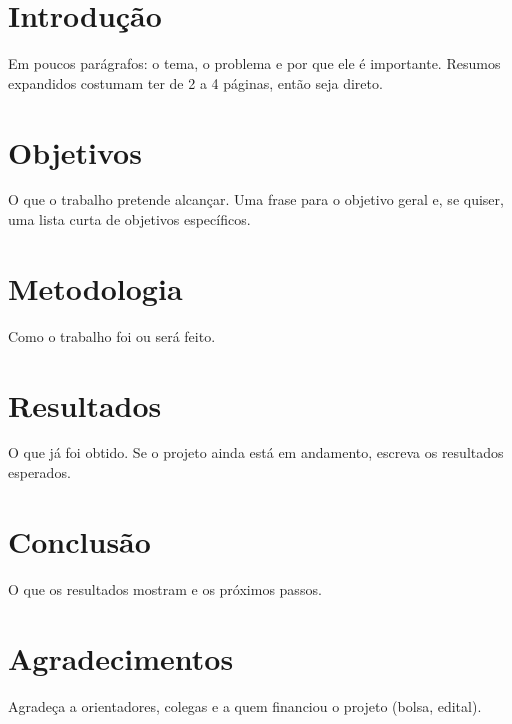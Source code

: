 \documentclass[12pt,a4paper]{article}
\title{$titulo}
\author{$autor \\ Nome da instituição}
\date{}
\begin{document}
\maketitle

\section{Introdução}

Em poucos parágrafos: o tema, o problema e por que ele é importante. Resumos expandidos costumam ter de 2 a 4 páginas, então seja direto.

\section{Objetivos}

O que o trabalho pretende alcançar. Uma frase para o objetivo geral e, se quiser, uma lista curta de objetivos específicos.

\section{Metodologia}

Como o trabalho foi ou será feito.

\section{Resultados}

O que já foi obtido. Se o projeto ainda está em andamento, escreva os resultados esperados.

\section{Conclusão}

O que os resultados mostram e os próximos passos.

\section*{Agradecimentos}

Agradeça a orientadores, colegas e a quem financiou o projeto (bolsa, edital).


\nocite{barbosa2010ihc}

\end{document}

